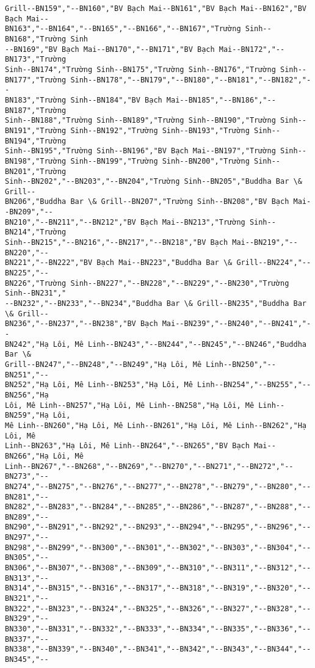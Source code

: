 \documentclass[11pt]{article}
\begin{document}
\begin{tcolorbox}[breakable, size=fbox, boxrule=.5pt, pad at break*=1mm, opacityfill=0]
\begin{Verbatim}[commandchars=\\\{\}]
Grill--BN159","--BN160","BV Bạch Mai--BN161","BV Bạch Mai--BN162","BV Bạch Mai--
BN163","--BN164","--BN165","--BN166","--BN167","Trường Sinh--BN168","Trường Sinh
--BN169","BV Bạch Mai--BN170","--BN171","BV Bạch Mai--BN172","--BN173","Trường
Sinh--BN174","Trường Sinh--BN175","Trường Sinh--BN176","Trường Sinh--
BN177","Trường Sinh--BN178","--BN179","--BN180","--BN181","--BN182","--
BN183","Trường Sinh--BN184","BV Bạch Mai--BN185","--BN186","--BN187","Trường
Sinh--BN188","Trường Sinh--BN189","Trường Sinh--BN190","Trường Sinh--
BN191","Trường Sinh--BN192","Trường Sinh--BN193","Trường Sinh--BN194","Trường
Sinh--BN195","Trường Sinh--BN196","BV Bạch Mai--BN197","Trường Sinh--
BN198","Trường Sinh--BN199","Trường Sinh--BN200","Trường Sinh--BN201","Trường
Sinh--BN202","--BN203","--BN204","Trường Sinh--BN205","Buddha Bar \& Grill--
BN206","Buddha Bar \& Grill--BN207","Trường Sinh--BN208","BV Bạch Mai--BN209","--
BN210","--BN211","--BN212","BV Bạch Mai--BN213","Trường Sinh--BN214","Trường
Sinh--BN215","--BN216","--BN217","--BN218","BV Bạch Mai--BN219","--BN220","--
BN221","--BN222","BV Bạch Mai--BN223","Buddha Bar \& Grill--BN224","--BN225","--
BN226","Trường Sinh--BN227","--BN228","--BN229","--BN230","Trường Sinh--BN231","
--BN232","--BN233","--BN234","Buddha Bar \& Grill--BN235","Buddha Bar \& Grill--
BN236","--BN237","--BN238","BV Bạch Mai--BN239","--BN240","--BN241","--
BN242","Hạ Lôi, Mê Linh--BN243","--BN244","--BN245","--BN246","Buddha Bar \&
Grill--BN247","--BN248","--BN249","Hạ Lôi, Mê Linh--BN250","--BN251","--
BN252","Hạ Lôi, Mê Linh--BN253","Hạ Lôi, Mê Linh--BN254","--BN255","--BN256","Hạ
Lôi, Mê Linh--BN257","Hạ Lôi, Mê Linh--BN258","Hạ Lôi, Mê Linh--BN259","Hạ Lôi,
Mê Linh--BN260","Hạ Lôi, Mê Linh--BN261","Hạ Lôi, Mê Linh--BN262","Hạ Lôi, Mê
Linh--BN263","Hạ Lôi, Mê Linh--BN264","--BN265","BV Bạch Mai--BN266","Hạ Lôi, Mê
Linh--BN267","--BN268","--BN269","--BN270","--BN271","--BN272","--BN273","--
BN274","--BN275","--BN276","--BN277","--BN278","--BN279","--BN280","--BN281","--
BN282","--BN283","--BN284","--BN285","--BN286","--BN287","--BN288","--BN289","--
BN290","--BN291","--BN292","--BN293","--BN294","--BN295","--BN296","--BN297","--
BN298","--BN299","--BN300","--BN301","--BN302","--BN303","--BN304","--BN305","--
BN306","--BN307","--BN308","--BN309","--BN310","--BN311","--BN312","--BN313","--
BN314","--BN315","--BN316","--BN317","--BN318","--BN319","--BN320","--BN321","--
BN322","--BN323","--BN324","--BN325","--BN326","--BN327","--BN328","--BN329","--
BN330","--BN331","--BN332","--BN333","--BN334","--BN335","--BN336","--BN337","--
BN338","--BN339","--BN340","--BN341","--BN342","--BN343","--BN344","--BN345","--

\end{Verbatim}
\end{tcolorbox}
\end{document}

